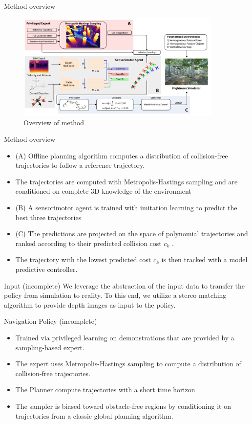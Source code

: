 \documentclass{beamer}
\begin{document}
\begin{frame}{Method overview}
	\begin{figure}
		\includegraphics[width=4in]{images/method-overview.png}
		\caption{Overview of method}
	\end{figure}
\end{frame}

\begin{frame}{Method overview}
	\begin{itemize}
		\item (A) Offline planning algorithm computes a distribution of collision-free trajectories to follow a reference trajectory. 
		\item The trajectories are computed with Metropolis-Hastings sampling and are conditioned on complete 3D knowledge of the environment
		\item (B) A sensorimotor agent is trained with imitation learning to predict the best three trajectories
		\item (C) The predictions are projected on the
space of polynomial trajectories and ranked according to their predicted collision cost $c_k$ . 
		\item The trajectory with the lowest predicted cost $c_k$ is then
tracked with a model predictive controller.
	\end{itemize}
\end{frame}

\begin{frame}{Input (incomplete)}
	We leverage the abstraction of the input data to transfer the policy from simulation to reality. To this end, we utilize a stereo matching algorithm \autocite{stereoMatching} to provide depth images as input to the policy. 
\end{frame}


\begin{frame}{Navigation Policy (incomplete)}
	\begin{itemize}
		\item Trained via privileged learning \autocite{Privileged_Learning} on demonstrations that are provided by a sampling-based expert. 
		\item The expert uses Metropolis-Hastings \autocite{MH_hasting} sampling to compute a distribution of collision-free trajectories.
		\item The Planner compute trajectories with a short time horizon 
		\item The sampler is biased toward obstacle-free regions by conditioning it on trajectories from a classic global planning algorithm\autocite{global_planning}.
	\end{itemize}
	
\end{frame}
\end{document}

